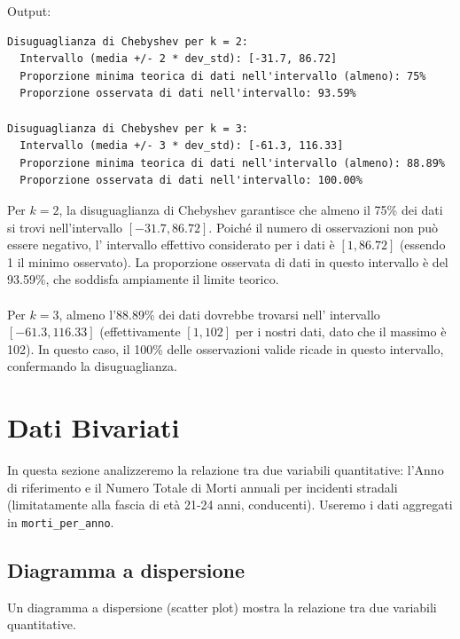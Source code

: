 \documentclass[14pt, openany, titlepage]{report} %
\begin{document}
\noindent
Output:
\begin{verbatim}
Disuguaglianza di Chebyshev per k = 2:
  Intervallo (media +/- 2 * dev_std): [-31.7, 86.72]
  Proporzione minima teorica di dati nell'intervallo (almeno): 75%
  Proporzione osservata di dati nell'intervallo: 93.59%

Disuguaglianza di Chebyshev per k = 3:
  Intervallo (media +/- 3 * dev_std): [-61.3, 116.33]
  Proporzione minima teorica di dati nell'intervallo (almeno): 88.89%
  Proporzione osservata di dati nell'intervallo: 100.00%
\end{verbatim}
\noindent
Per $k=2$, la disuguaglianza di Chebyshev garantisce che almeno 
il 75\% dei dati si trovi nell'intervallo $[-31.7, 86.72]$. 
Poiché il numero di osservazioni non può essere negativo, l'
intervallo effettivo considerato per i dati è $[1, 86.72]$ 
(essendo 1 il minimo osservato). La proporzione osservata di
 dati in questo intervallo è del 93.59\%, che soddisfa ampiamente 
 il limite teorico.\\\\
Per $k=3$, almeno l'88.89\% dei dati dovrebbe trovarsi nell'
intervallo $[-61.3, 116.33]$ (effettivamente $[1, 102]$ per 
i nostri dati, dato che il massimo è 102). In questo caso, il
 100\% delle osservazioni valide ricade in questo intervallo, 
 confermando la disuguaglianza.


\chapter{Dati Bivariati}
In questa sezione analizzeremo la relazione tra due variabili 
quantitative: l'Anno di riferimento e il Numero Totale di Morti 
annuali per incidenti stradali (limitatamente alla fascia di età 
21-24 anni, conducenti). Useremo i dati aggregati in
 \texttt{morti\_per\_anno}.

\section{Diagramma a dispersione}
Un diagramma a dispersione (scatter plot) mostra la relazione tra due variabili quantitative.
\end{document}
